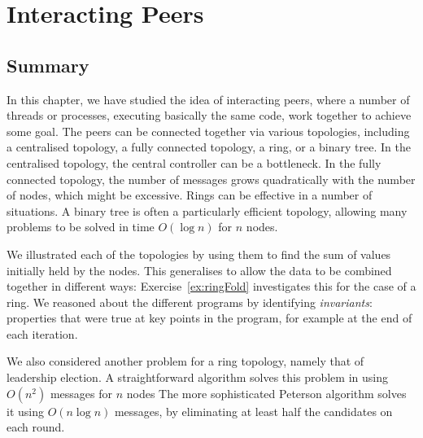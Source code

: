 \chapter{Interacting Peers}



\section{Summary}

In this chapter, we have studied the idea of interacting peers, where a number
of threads or processes, executing basically the same code, work together to
achieve some goal.  The peers can be connected together via various
topologies, including a centralised topology, a fully connected topology, a
ring, or a binary tree.  In the centralised topology, the central controller
can be a bottleneck.  In the fully connected topology, the number of messages
grows quadratically with the number of nodes, which might be excessive.  Rings
can be effective in a number of situations.  A binary tree is often a
particularly efficient topology, allowing many problems to be solved in time
$O(\log n)$ for $n$ nodes.

We illustrated each of the topologies by using them to find the sum of
values initially held by the nodes.  This generalises to allow the data to be
combined together in different ways: Exercise~\ref{ex:ringFold} investigates
this for the case of a ring.
We reasoned about the different programs by identifying \emph{invariants}:
properties that were true at key points in the program, for example at the end
of each iteration. 

We also considered another problem for a ring topology, namely that of
leadership election.  A straightforward algorithm solves this problem in using
$O(n^2)$ messages for $n$ nodes  The more sophisticated Peterson algorithm
solves it using $O(n \log n)$ messages, by eliminating at least half the
candidates on each round.




\exercises














